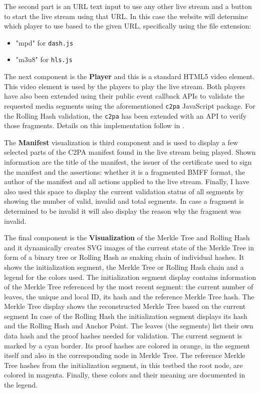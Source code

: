 The second part is an URL text input to use any other live stream and a button to start the live stream using that URL. In this case the website will determine which player to use based to the given URL, specifically using the file extension:

\begin{itemize}
    \item "mpd" for \texttt{dash.js}
    \item "m3u8" for \texttt{hls.js}
\end{itemize}

The next component is the \textbf{Player} and this is a standard HTML5 video element. This video element is used by the players to play the live stream. Both players have also been extended using their public event callback APIs to validate the requested media segments using the aforementioned \texttt{c2pa} JavaScript package. For the Rolling Hash validation, the \texttt{c2pa} has been extended with an API to verify those fragments. Details on this implementation follow in .

The \textbf{Manifest} visualization is third component and is used to display a few selected parts of the C2PA manifest found in the live stream being played. Shown information are the title of the manifest, the issuer of the certificate used to sign the manifest and the assertions: whether it is a fragmented BMFF format, the author of the manifest and all actions applied to the live stream. Finally, I have also used this space to display the current validation status of all segments by showing the number of valid, invalid and total segments. In case a fragment is determined to be invalid it will also display the reason why the fragment was invalid.

The final component is the \textbf{Visualization} of the Merkle Tree and Rolling Hash and it dynamically creates SVG images of the current state of the Merkle Tree in form of a binary tree or Rolling Hash as snaking chain of individual hashes. It shows the initialization segment, the Merkle Tree or Rolling Hash chain and a legend for the colors used. The initialization segment display contains information of the Merkle Tree referenced by the most recent segment: the current number of leaves, the unique and local ID, its hash and the reference Merkle Tree hash. The Merkle Tree display shows the reconstructed Merkle Tree based on the current segment In case of the Rolling Hash the initialization segment displays its hash and the Rolling Hash and Anchor Point. The leaves (the segments) list their own data hash and the proof hashes needed for validation. The current segment is marked by a cyan border. Its proof hashes are colored in orange, in the segment itself and also in the corresponding node in Merkle Tree. The reference Merkle Tree hashes from the initialization segment, in this testbed the root node, are colored in magenta. Finally, these colors and their meaning are documented in the legend.
